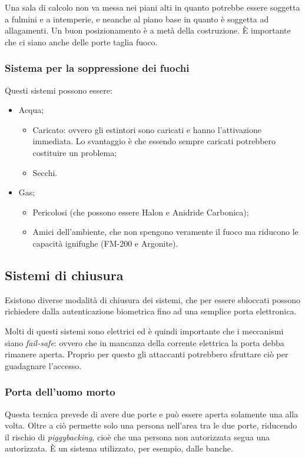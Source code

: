 Una sala di calcolo non va messa nei piani alti in quanto potrebbe essere
soggetta a fulmini e a intemperie, e neanche al piano base in quanto è soggetta
ad allagamenti. Un buon posizionamento è a metà della costruzione. È
importante che ci siano anche delle porte taglia fuoco.

\subsubsection{Sistema per la soppressione dei fuochi}

Questi sistemi possono essere:
\begin{itemize}
\item Acqua;
\begin{itemize}
\item Caricato: ovvero gli estintori sono caricati e hanno l'attivazione
immediata. Lo svantaggio è che essendo sempre caricati potrebbero costituire un
problema;
\item Secchi.
\end{itemize}
\item Gas;
\begin{itemize}
\item Pericolosi (che possono essere Halon e Anidride Carbonica);
\item Amici dell'ambiente, che non spengono veramente il fuoco ma riducono le
capacità ignifughe (FM-200 e Argonite).
\end{itemize}
\end{itemize}

\subsection{Sistemi di chiusura}

Esistono diverse modalità di chiusura dei sistemi, che per essere sbloccati
possono richiedere dalla autenticazione biometrica fino ad una semplice
porta elettronica.

Molti di questi sistemi sono elettrici ed è quindi importante che i
meccanismi siano \textit{fail-safe}: ovvero che in mancanza della corrente
elettrica la porta debba rimanere aperta. Proprio per questo gli attaccanti
potrebbero sfruttare ciò per guadagnare l'accesso.

\subsubsection{Porta dell'uomo morto}
Questa tecnica prevede di avere due porte e può essere aperta solamente una alla volta. Oltre a ciò permette solo una persona nell'area tra le due porte, riducendo il rischio di \textit{piggybacking}, cioè che una persona non autorizzata segua una autorizzata. È un sistema utilizzato, per esempio, dalle banche.



